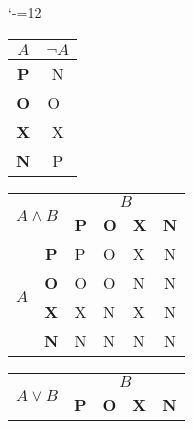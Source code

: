 \documentclass[a4paper, 11pt]{article}
\begin{document}
\bigskip
\begin{table}[h]
\catcode`-=12
\centering
\begin{tabular}{|c|c|}
\hline
$A$        & $\neg A$ \\ \hline
\textbf{P} & N        \\ \hline
\textbf{O} & O~\\ \hline
\textbf{X} & X        \\ \hline
\textbf{N} & P        \\ \hline
\end{tabular}
\begin{tabular}{| c | c | c | c | c | c |}
\hline
\multicolumn{2}{|l|}{\multirow{2}{*}{$A \wedge B$}}            & \multicolumn{4}{c|}{$B$}                                                                                           \\ \cline{3-6} 
\multicolumn{2}{|l|}{}                                & \multicolumn{1}{l|}{\textbf{P}} & \multicolumn{1}{l|}{\textbf{O}} & \multicolumn{1}{l|}{\textbf{X}} & \textbf{N} \\ \hline
\multicolumn{1}{|l|}{\multirow{4}{*}{$A$}} & \textbf{P} & \multicolumn{1}{l|}{P}          & \multicolumn{1}{l|}{O}          & \multicolumn{1}{l|}{X}          & N          \\ \cline{2-6} 
\multicolumn{1}{|l|}{}                   & \textbf{O} & \multicolumn{1}{l|}{O}          & \multicolumn{1}{l|}{O}          & \multicolumn{1}{l|}{N}          & N          \\ \cline{2-6} 
\multicolumn{1}{|l|}{}                   & \textbf{X} & \multicolumn{1}{l|}{X}          & \multicolumn{1}{l|}{N}          & \multicolumn{1}{l|}{X}          & N          \\ \cline{2-6} 
\multicolumn{1}{|l|}{}                   & \textbf{N} & \multicolumn{1}{l|}{N}          & \multicolumn{1}{l|}{N}          & \multicolumn{1}{l|}{N}          & N          \\ \hline
\end{tabular}
\begin{tabular}{| c | c | c | c | c | c |}
\hline
\multicolumn{2}{|l|}{\multirow{2}{*}{$A \lor B$}}            & \multicolumn{4}{c|}{$B$}                                                                                           \\ \cline{3-6} 
\multicolumn{2}{|l|}{}                                & \multicolumn{1}{l|}{\textbf{P}} & \multicolumn{1}{l|}{\textbf{O}} & \multicolumn{1}{l|}{\textbf{X}} & \textbf{N} \\ \hline

\end{tabular}
\end{table}
\end{document}
